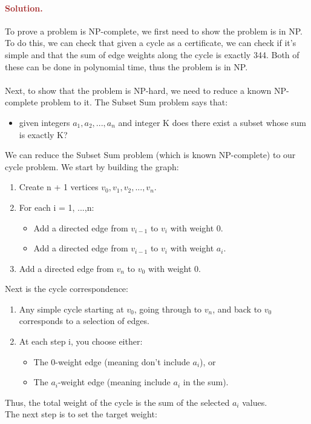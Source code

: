 \paragraph{\textcolor{brown}{Solution.}}
To prove a problem is NP-complete, we first need to show the problem is in NP. To do this, we can check that given a cycle as a certificate, we can check if it's simple and that the sum of edge weights along the cycle is exactly 344. Both of these can be done in polynomial time, thus the problem is in NP. 
\\ \\ Next, to show that the problem is NP-hard, we need to reduce a known NP-complete problem to it. The Subset Sum problem says that: 
\begin{itemize} \item given integers $a_1, a_2, ..., a_n$ and integer K does there exist a subset whose sum is exactly K? \end{itemize}
We can reduce the Subset Sum problem (which is known NP-complete) to our cycle problem. We start by building the graph:
\begin{enumerate} \item Create n + 1 vertices $v_0, v_1, v_2, ..., v_n$. \item For each i = 1, ...,n: \begin{itemize} \item Add a directed edge from $v_{i-1}$ to $v_i$ with weight 0. \item Add a directed edge from $v_{i-1}$ to $v_i$ with weight $a_i$. \end{itemize} \item Add a directed edge from $v_n$ to $v_0$ with weight 0. \end{enumerate}
Next is the cycle correspondence:
\begin{enumerate} \item Any simple cycle starting at $v_0$, going through to $v_n$, and back to $v_0$ corresponds to a selection of edges. \item At each step i, you choose either: \begin{itemize} \item The 0-weight edge (meaning don't include $a_i$), or \item The $a_i$-weight edge (meaning include $a_i$ in the sum). \end{itemize} \end{enumerate}
Thus, the total weight of the cycle is the sum of the selected $a_i$ values.
\\ The next step is to set the target weight:
